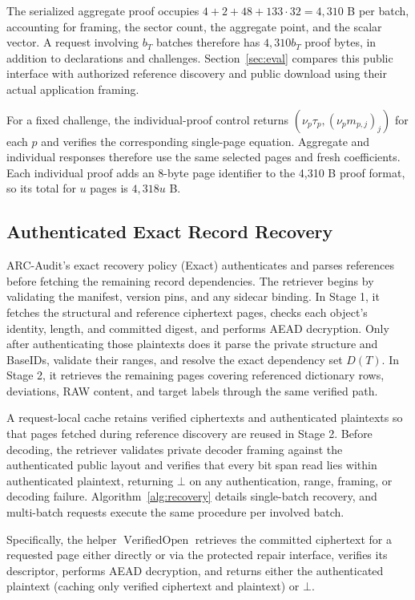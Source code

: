\documentclass[10pt,journal]{IEEEtran}
\begin{document}
The serialized aggregate proof occupies $4+2+48+133\cdot32=4{,}310$ B per batch, accounting for framing, the sector count, the aggregate point, and the scalar vector. A request involving $b_T$ batches therefore has $4{,}310 b_T$ proof bytes, in addition to declarations and challenges. Section~\ref{sec:eval} compares
this public interface with authorized reference discovery and public download
using their actual application framing.

For a fixed challenge, the individual-proof control returns
$(\nu_p\tau_p,(\nu_pm_{p,j})_j)$ for each $p$ and verifies the corresponding
single-page equation. Aggregate and individual responses therefore use the
same selected pages and fresh coefficients. Each individual proof adds an
8-byte page identifier to the 4,310 B proof format, so its total for $u$ pages
is $4{,}318u$ B.

\subsection{Authenticated Exact Record Recovery}\label{sec:c3}
ARC-Audit's exact recovery policy (Exact) authenticates and parses references before fetching the remaining record dependencies. The retriever begins by validating the manifest, version pins, and any sidecar binding. In Stage 1, it fetches the structural and reference ciphertext pages, checks each object's identity, length, and committed digest, and performs AEAD decryption. Only after authenticating those plaintexts does it parse the private structure and BaseIDs, validate their ranges, and resolve the exact dependency set $D(T)$. In Stage 2, it retrieves the remaining pages covering referenced dictionary rows, deviations, RAW content, and target labels through the same verified path.

A request-local cache retains verified ciphertexts and authenticated plaintexts so that pages fetched during reference discovery are reused in Stage 2. Before decoding, the retriever validates private decoder framing against the authenticated public layout and verifies that every bit span read lies within authenticated plaintext, returning $\bot$ on any authentication, range, framing, or decoding failure. Algorithm~\ref{alg:recovery} details single-batch recovery, and multi-batch requests execute the same procedure per involved batch.

Specifically, the helper $\operatorname{VerifiedOpen}$ retrieves the committed ciphertext for a requested page either directly or via the protected repair interface, verifies its descriptor, performs AEAD decryption, and returns either the authenticated plaintext (caching only verified ciphertext and plaintext) or $\bot$.
\end{document}
